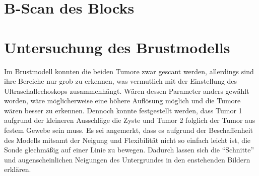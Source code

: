 \section{B-Scan des Blocks}

\section{Untersuchung des Brustmodells}
Im Brustmodell konnten die beiden Tumore zwar gescant werden, allerdings sind ihre Bereiche nur grob zu erkennen,
was vermutlich mit der Einstellung des Ultraschallechoskops zusammenhängt.
Wären dessen Parameter anders gewählt worden, wäre möglicherweise eine höhere Auflösung möglich und die Tumore wären besser zu erkennen.
Dennoch konnte festgestellt werden, dass Tumor 1 aufgrund der kleineren Ausschläge die Zyste und Tumor 2 folglich der Tumor aus 
festem Gewebe sein muss.
Es sei angemerkt, dass es aufgrund der Beschaffenheit des Modells mitsamt der Neigung und Flexibilität nicht so einfach leicht ist,
die Sonde glechmäßig auf einer Linie zu bewegen. 
Dadurch lassen sich die \enquote{Schnitte} und augenscheinlichen Neigungen des Untergrundes in den enstehenden Bildern erklären.
